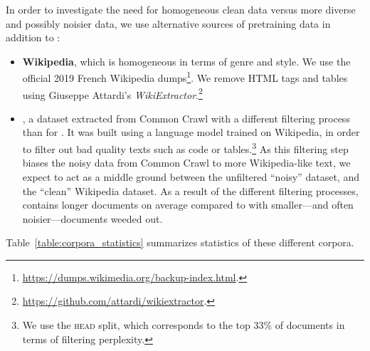 In order to investigate the need for homogeneous clean data versus more diverse and possibly noisier data, we use alternative sources of pretraining data in addition to \oscar:
\begin{itemize}
    \item \textbf{Wikipedia}, which is homogeneous in terms of genre and style. We use the official 2019 French Wikipedia dumps\footnote{ \url{https://dumps.wikimedia.org/backup-index.html}.}. We remove HTML tags and tables using Giuseppe Attardi's  \emph{WikiExtractor}.\footnote{ \url{https://github.com/attardi/wikiextractor}.}
    \item \textbf{\ccnet} \cite{wenzek-etal-2020-ccnet}, a dataset extracted from Common Crawl with a different filtering process than for \oscar. It was built using a language model trained on Wikipedia, in order to filter out bad quality texts such as code or tables.\footnote{We use the \textsc{head} split, which corresponds to the top 33\% of documents in terms of filtering perplexity.} As this filtering step biases the noisy data from Common Crawl to more Wikipedia-like text, we expect \ccnet to act as a middle ground between the unfiltered ``noisy'' \oscar dataset, and the ``clean'' Wikipedia dataset. As a result of the different filtering processes, \ccnet contains longer documents on average compared to \oscar with smaller---and often noisier---documents weeded out.
\end{itemize}
Table~\ref{table:corpora_statistics} summarizes statistics of these different corpora.

\begin{table}[ht]
    \centering\small
    \caption{Statistics on the pretraining datasets used.}
    \label{table:corpora_statistics}
\end{table}

